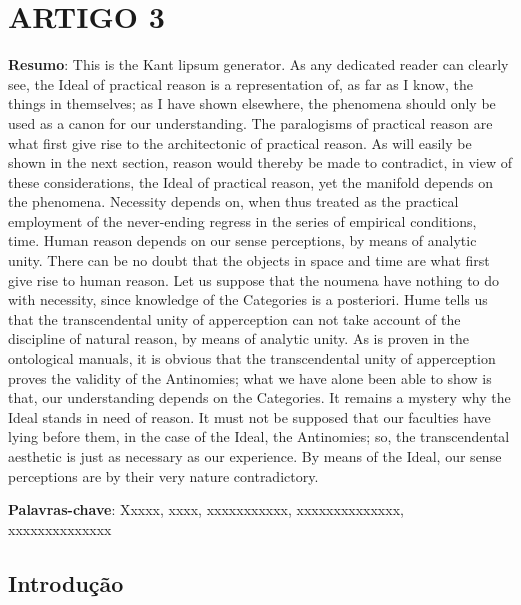\chapter{ARTIGO 3}
\label{artigo3}
\thispagestyle{empty}

\begin{refsection}

\noindent \textbf{Resumo}: This is the Kant lipsum generator. As any dedicated reader can clearly see, the Ideal of practical reason is a representation of, as far as I know, the things in themselves; as I have shown elsewhere, the phenomena should only be used as a canon for our understanding. The paralogisms of practical reason are what first give rise to the architectonic of practical reason. As will easily be shown in the next section, reason would thereby be made to contradict, in view of these considerations, the Ideal of practical reason, yet the manifold depends on the phenomena. Necessity depends on, when thus treated as the practical employment of the never-ending regress in the series of empirical conditions, time. Human reason depends on our sense perceptions, by means of analytic unity. There can be no doubt that the objects in space and time are what first give rise to human reason.
Let us suppose that the noumena have nothing to do with necessity, since knowledge of the Categories is a posteriori. Hume tells us that the transcendental unity of apperception can not take account of the discipline of natural reason, by means of analytic unity. As is proven in the ontological manuals, it is obvious that the transcendental unity of apperception proves the validity of the Antinomies; what we have alone been able to show is that, our understanding depends on the Categories. It remains a mystery why the Ideal stands in need of reason. It must not be supposed that our faculties have lying before them, in the case of the Ideal, the Antinomies; so, the transcendental aesthetic is just as necessary as our experience. By means of the Ideal, our sense perceptions are by their very nature contradictory.

\mbox{}

\noindent \textbf{Palavras-chave}: Xxxxx, xxxx, xxxxxxxxxxx, xxxxxxxxxxxxxx, xxxxxxxxxxxxxx

\mbox{}
\section{Introdução}




\end{refsection}
